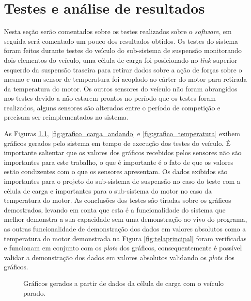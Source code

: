 \chapter{Testes e análise de resultados}
	\label{ch:testes}
Nesta seção serão comentados sobre os testes realizados sobre o \textit{software}, em seguida será comentado um pouco dos resultados obtidos. Os testes do sistema foram feitos durante testes do veículo do sub-sistema de suspensão monitorando dois elementos do veículo, uma célula de carga foi posicionado no \textit{link} superior esquerdo da suspensão traseira para retirar dados sobre a ação de forças sobre o mesmo e um sensor de temperatura foi acoplado ao cárter do motor para retirada da temperatura do motor. Os outros sensores do veículo não foram abrangidos nos testes devido a não estarem prontos no período que os testes foram realizados, alguns sensores são alterados entre o período de competição e precisam ser reimplementados no sistema. 

As Figuras \ref{fig:grafico_carga_parado}, \ref{fig:grafico_carga_andando} e \ref{fig:grafico_temperatura} exibem gráficos gerados pelo sistema em tempo de execução dos testes do veículo. É importante salientar que os valores dos gráficos recebidos pelos sensores não são importantes para este trabalho, o que é importante é o fato de que os valores estão condizentes com o que os sensores apresentam. Os dados exibidos são importantes para o projeto do sub-sistema de suspensão no caso do teste com a célula de carga e importantes para o sub-sistema do motor no caso da temperatura do motor. As conclusões dos testes são tiradas sobre os gráficos demostrados, levando em conta que esta é a funcionalidade do sistema que melhor demonstra a sua capacidade sem uma demonstração ao vivo do programa, as outras funcionalidade de demonstração dos dados em valores absolutos como a temperatura do motor demonstrada na Figura \ref{fig:telaprincipal} foram verificadas e funcionam em conjunto com os \textit{plots} dos gráficos, consequentemente é possível validar a demonstração dos dados em valores absolutos validando os \textit{plots} dos gráficos.

 \begin{figure}[!htb]
	\center
	\caption{Gráficos gerados a partir de dados da célula de carga com o veículo parado.}
	\qquad
	\label{fig:grafico_carga_parado}
\end{figure}
     

